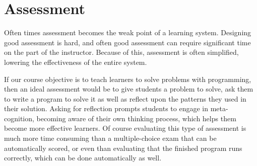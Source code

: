 \documentclass[12pt]{article}
\begin{document}

\section*{Assessment}
Often times assessment becomes the weak point of a learning
system. Designing good assessment is
hard\autocite{lister_blooming_2000,traynor_synthesis_2005}, and often
good assessment can require significant time on the part of the
instructor. Because of this, assessment is often simplified, lowering
the effectiveness of the entire system.

If our course objective is to teach learners to solve problems with
programming, then an ideal assessment would be to give students a
problem to solve, ask them to write a program to solve it as well as
reflect upon the patterns they used in their solution. Asking for
reflection prompts students to engage in meta-cognition, becoming
aware of their own thinking process, which helps them become more
effective
learners\autocite{ambrose_how_2010,chi_selfexplanations_1989}. Of
course evaluating this type of assessment is much more time consuming
than a multiple-choice exam that can be automatically scored, or even
than evaluating that the finished program runs correctly, which can be
done automatically as well\autocite{cheang_automated_2003}.
\end{document}
